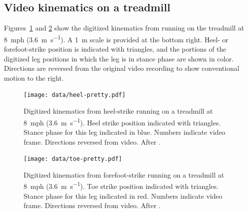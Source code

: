 \subsection{Video kinematics on a treadmill}
Figures~\ref{fig:results:heelpretty} and \ref{fig:results:toepretty} show the digitized kinematics from running on the treadmill at \SI{8}{mph} (\SI{3.6}{\meter\per\second}). A \SI{1}{\meter} scale is provided at the bottom right. Heel- or forefoot-strike position is indicated with triangles, and the portions of the digitized leg positions in which the leg is in stance phase are shown in color. Directions are reversed from the original video recording to show conventional motion to the right. 
\begin{figure}[p]
\begin{center}
\texttt{[image: data/heel-pretty.pdf]}
\end{center}
\caption{Digitized kinematics from heel-strike running on a treadmill at \SI{8}{mph} (\SI{3.6}{\meter\per\second}). Heel strike position indicated with triangles. Stance phase for this leg indicated in blue. Numbers indicate video frame. Directions reversed from video. After \citep{marey1873locomotion, muybridge1901human}.}  
\label{fig:results:heelpretty}
\end{figure}

\begin{figure}[p]
\begin{center}
\texttt{[image: data/toe-pretty.pdf]}
\end{center}
\caption{Digitized kinematics from forefoot-strike running on a treadmill at \SI{8}{mph} (\SI{3.6}{\meter\per\second}). Toe strike position indicated with triangles. Stance phase for this leg indicated in red. Numbers indicate video frame. Directions reversed from video. After \citep{marey1873locomotion, muybridge1901human}.}  
\label{fig:results:toepretty}
\end{figure}


